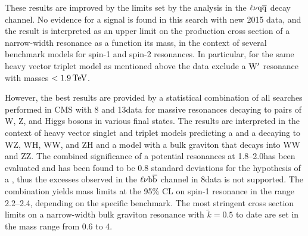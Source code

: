 These results are improved by the limits set by the analysis in the $\ell\nu\mathrm{q}\overline{\mathrm{q}}$ decay channel.
No evidence for a signal is found in this search with new 2015 data, and the result is interpreted as an upper limit on the production cross section of a narrow-width resonance as a function its mass,
in the context of several benchmark models for spin-1 and spin-2 resonances. In particular, for the same heavy vector triplet model as mentioned above the data exclude a $\mathrm{W}^\prime$ resonance with masses $< 1.9\,\text{Te\hspace{-.08em}V}$.

However, the best results are provided by a statistical combination of all searches performed in CMS with 8 and 13\TeV data for massive resonances decaying to pairs of W, Z, and Higgs bosons in various final states.
The results are interpreted in the context of heavy vector singlet and triplet models predicting a \Wpr and a \Zpr decaying to WZ, WH, WW, and ZH and a model with a bulk graviton that decays into WW and ZZ.
The combined significance of a potential resonances at 1.8--2.0\TeV has been evaluated and has been found to be 0.8 standard deviations for the hypothesis of a \Wpr,
thus the excesses observed in the $\ell\nu{\mathrm{b}\overline{\mathrm{b}}}$ channel in 8\TeV data is not supported.
The combination yields mass limits at the 95\% CL on spin-1 resonance in the range 2.2--2.4\TeV, depending on the specific benchmark.
The most stringent cross section limits on a narrow-width bulk graviton resonance with $\tilde{k} = 0.5$ to date are set in the mass range from 0.6 to 4\TeV.
